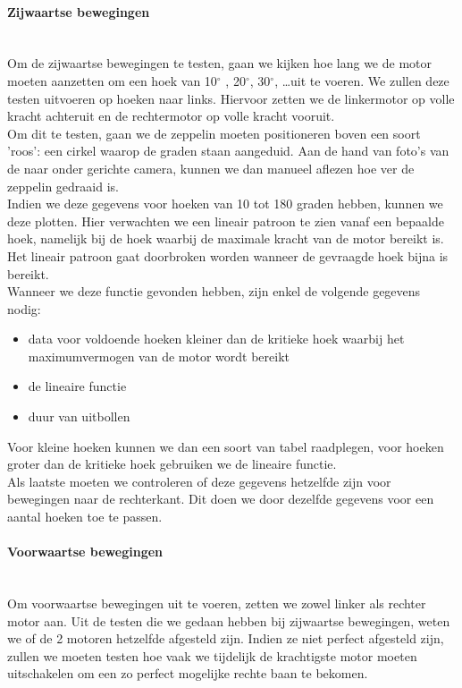 \documentclass[eind]{penoverslag}
\begin{document}
\paragraph{Zijwaartse bewegingen} ~\\ 
Om de zijwaartse bewegingen te testen, gaan we kijken hoe lang we de motor moeten aanzetten om een hoek van 10$^\circ$ , 20$^\circ$, 30$^\circ$, \ldots uit te voeren. We zullen deze testen uitvoeren op hoeken naar links. Hiervoor zetten we de linkermotor op volle kracht achteruit en de rechtermotor op volle kracht vooruit. \\

Om dit te testen, gaan we de zeppelin moeten positioneren boven een soort 'roos': een cirkel waarop de graden staan aangeduid. Aan de hand van foto's van de naar onder gerichte camera, kunnen we dan manueel aflezen hoe ver de zeppelin gedraaid is. \\

Indien we deze gegevens voor hoeken van 10 tot 180 graden hebben, kunnen we deze plotten. Hier verwachten we een lineair patroon te zien vanaf een bepaalde hoek, namelijk bij de hoek waarbij de maximale kracht van de motor bereikt is. Het lineair patroon gaat doorbroken worden wanneer de gevraagde hoek bijna is bereikt. \\

Wanneer we deze functie gevonden hebben, zijn enkel de volgende gegevens nodig:
\begin{itemize}
	\item data voor voldoende hoeken kleiner dan de kritieke hoek waarbij het maximumvermogen van de motor wordt bereikt
	\item de lineaire functie
	\item duur van uitbollen
\end{itemize}
Voor kleine hoeken kunnen we dan een soort van tabel raadplegen, voor hoeken groter dan de kritieke hoek gebruiken we de lineaire functie. \\

Als laatste moeten we controleren of deze gegevens hetzelfde zijn voor bewegingen naar de rechterkant.  Dit doen we door dezelfde gegevens voor een aantal hoeken toe te passen. \\

\paragraph{Voorwaartse bewegingen} ~\\ 
Om voorwaartse bewegingen uit te voeren, zetten we zowel linker als rechter motor aan. Uit de testen die we gedaan hebben bij zijwaartse bewegingen, weten we of de 2 motoren hetzelfde afgesteld zijn. Indien ze niet perfect afgesteld zijn, zullen we moeten testen hoe vaak we tijdelijk de krachtigste motor moeten uitschakelen om een zo perfect mogelijke rechte baan te bekomen. \\
\end{document}
